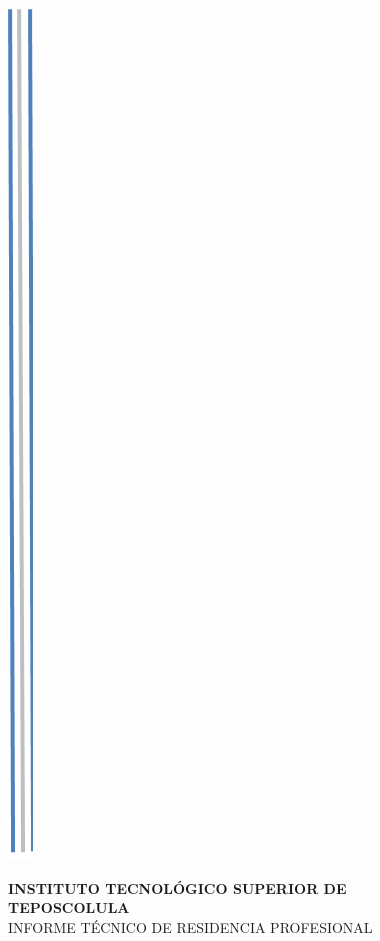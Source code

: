 \begin{figure}[h]
\begin{minipage}[c]{0.3\textwidth}
\end{minipage}
\begin{minipage}[c]{0.08\textwidth}
\includegraphics[scale=1]{lineas.png}
\end{minipage}
\begin{minipage}[r]{0.7\textwidth} 
\thispagestyle{empty}
\vspace{1cm}
\begin{center}
{\Large\bf INSTITUTO TECNOL\'OGICO SUPERIOR DE TEPOSCOLULA}\\
	\vspace{1.5cm}
	{\large INFORME T\'ECNICO DE RESIDENCIA PROFESIONAL}\\ \vspace{2cm}

\end{center}
\end{minipage}
\end{figure}
